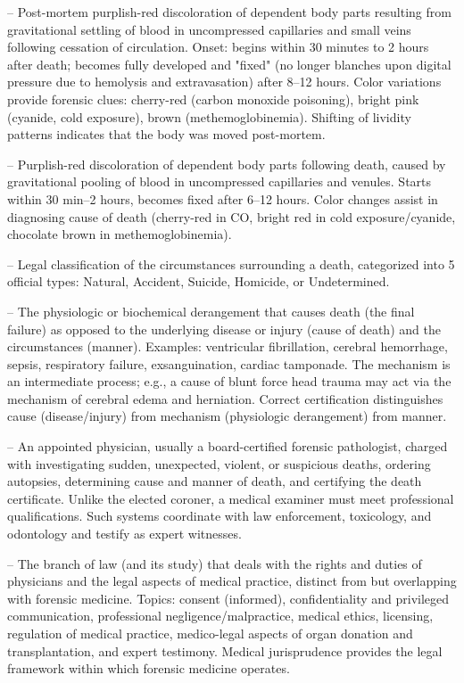 -- Post-mortem purplish-red discoloration of dependent body parts resulting from gravitational settling of blood in uncompressed capillaries and small veins following cessation of circulation. Onset: begins within 30 minutes to 2 hours after death; becomes fully developed and "fixed" (no longer blanches upon digital pressure due to hemolysis and extravasation) after 8--12 hours. Color variations provide forensic clues: cherry-red (carbon monoxide poisoning), bright pink (cyanide, cold exposure), brown (methemoglobinemia). Shifting of lividity patterns indicates that the body was moved post-mortem.

-- Purplish-red discoloration of dependent body parts following death, caused by gravitational pooling of blood in uncompressed capillaries and venules. Starts within 30 min--2 hours, becomes fixed after 6--12 hours. Color changes assist in diagnosing cause of death (cherry-red in CO, bright red in cold exposure/cyanide, chocolate brown in methemoglobinemia).

-- Legal classification of the circumstances surrounding a death, categorized into 5 official types: Natural, Accident, Suicide, Homicide, or Undetermined.

-- The physiologic or biochemical derangement that causes death (the final failure) as opposed to the underlying disease or injury (cause of death) and the circumstances (manner). Examples: ventricular fibrillation, cerebral hemorrhage, sepsis, respiratory failure, exsanguination, cardiac tamponade. The mechanism is an intermediate process; e.g., a cause of blunt force head trauma may act via the mechanism of cerebral edema and herniation. Correct certification distinguishes cause (disease/injury) from mechanism (physiologic derangement) from manner.

-- An appointed physician, usually a board-certified forensic pathologist, charged with investigating sudden, unexpected, violent, or suspicious deaths, ordering autopsies, determining cause and manner of death, and certifying the death certificate. Unlike the elected coroner, a medical examiner must meet professional qualifications. Such systems coordinate with law enforcement, toxicology, and odontology and testify as expert witnesses.

-- The branch of law (and its study) that deals with the rights and duties of physicians and the legal aspects of medical practice, distinct from but overlapping with forensic medicine. Topics: consent (informed), confidentiality and privileged communication, professional negligence/malpractice, medical ethics, licensing, regulation of medical practice, medico-legal aspects of organ donation and transplantation, and expert testimony. Medical jurisprudence provides the legal framework within which forensic medicine operates.

